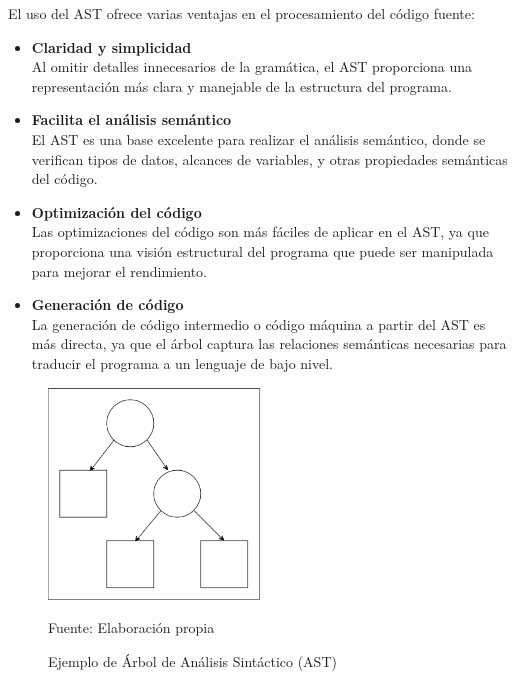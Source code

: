 El uso del AST ofrece varias ventajas en el procesamiento del código fuente:

\begin{itemize}
  \item \textbf{Claridad y simplicidad} \\
  Al omitir detalles innecesarios de la gramática, el AST proporciona una representación más clara y manejable de la estructura del programa.
  \item \textbf{Facilita el análisis semántico} \\
  El AST es una base excelente para realizar el análisis semántico, donde se verifican tipos de datos, alcances de variables, y otras propiedades semánticas del código.
  \item \textbf{Optimización del código} \\
  Las optimizaciones del código son más fáciles de aplicar en el AST, ya que proporciona una visión estructural del programa que puede ser manipulada para mejorar el rendimiento.
  \item \textbf{Generación de código} \\
  La generación de código intermedio o código máquina a partir del AST es más directa, ya que el árbol captura las relaciones semánticas necesarias para traducir el programa a un lenguaje de bajo nivel.
\end{itemize}

\begin{figure}[!h]
  \centering
  \includegraphics[width=0.5\textwidth]{images/ast.png}
  \caption{Ejemplo de Árbol de Análisis Sintáctico (AST)}
  \centering Fuente: Elaboración propia
  \label{fig:ast}
\end{figure}

